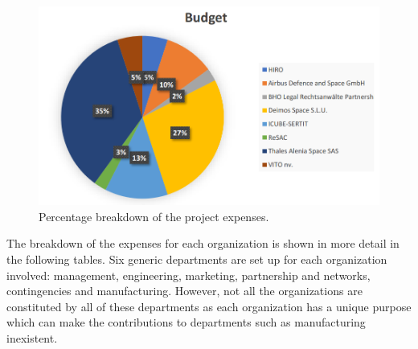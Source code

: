 

\begin{figure}[H]
\centering
\includegraphics[scale=0.5]{./images/budget/budgetPie}
\caption{Percentage breakdown of the project expenses.}
\label{rules}
\end{figure}

The breakdown of the expenses for each organization is shown in more detail in the following tables. Six generic departments are set up for each organization involved: management, engineering, marketing, partnership and networks, contingencies and manufacturing. However, not all the organizations are constituted by all of these departments as each organization has a unique purpose which can make the contributions to departments such as manufacturing inexistent.\\


